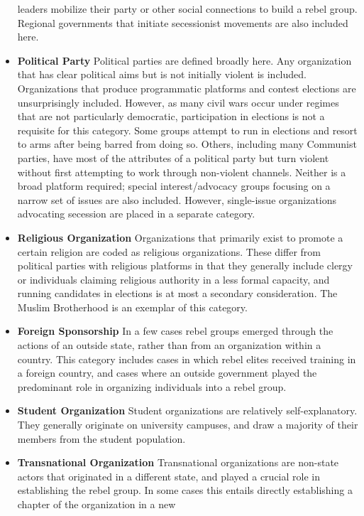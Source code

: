\documentclass[12pt,]{book}
\theoremstyle{definition}
\theoremstyle{definition}
\theoremstyle{definition}
\theoremstyle{remark}
\begin{document}
\begin{itemize}
  leaders mobilize their party or other social connections to build a
  rebel group. Regional governments that initiate secessionist movements
  are also included here.
\item
  \textbf{Political Party} Political parties are defined broadly here.
  Any organization that has clear political aims but is not initially
  violent is included. Organizations that produce programmatic platforms
  and contest elections are unsurprisingly included. However, as many
  civil wars occur under regimes that are not particularly democratic,
  participation in elections is not a requisite for this category. Some
  groups attempt to run in elections and resort to arms after being
  barred from doing so. Others, including many Communist parties, have
  most of the attributes of a political party but turn violent without
  first attempting to work through non-violent channels. Neither is a
  broad platform required; special interest/advocacy groups focusing on
  a narrow set of issues are also included. However, single-issue
  organizations advocating secession are placed in a separate category.
\item
  \textbf{Religious Organization} Organizations that primarily exist to
  promote a certain religion are coded as religious organizations. These
  differ from political parties with religious platforms in that they
  generally include clergy or individuals claiming religious authority
  in a less formal capacity, and running candidates in elections is at
  most a secondary consideration. The Muslim Brotherhood is an exemplar
  of this category.
\item
  \textbf{Foreign Sponsorship} In a few cases rebel groups emerged
  through the actions of an outside state, rather than from an
  organization within a country. This category includes cases in which
  rebel elites received training in a foreign country, and cases where
  an outside government played the predominant role in organizing
  individuals into a rebel group.
\item
  \textbf{Student Organization} Student organizations are relatively
  self-explanatory. They generally originate on university campuses, and
  draw a majority of their members from the student population.
\item
  \textbf{Transnational Organization} Transnational organizations are
  non-state actors that originated in a different state, and played a
  crucial role in establishing the rebel group. In some cases this
  entails directly establishing a chapter of the organization in a new

\end{itemize}
\end{document}
